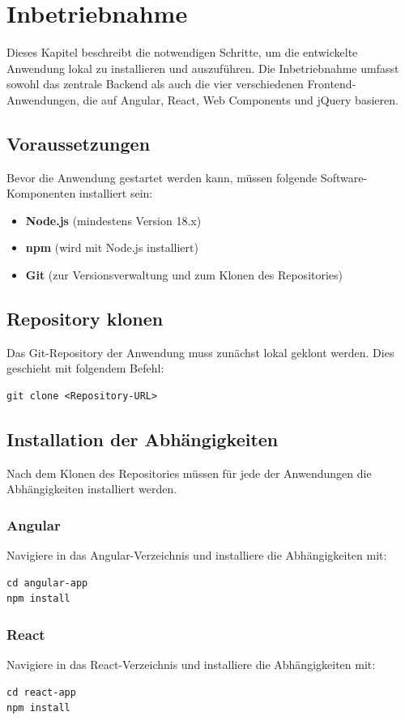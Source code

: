 \documentclass[oneside]{ausarbeitung}
\begin{document}
\chapter{Inbetriebnahme}
Dieses Kapitel beschreibt die notwendigen Schritte, um die entwickelte Anwendung lokal zu installieren und auszuführen. Die Inbetriebnahme umfasst sowohl das zentrale Backend als auch die vier verschiedenen Frontend-Anwendungen, die auf Angular, React, Web Components und jQuery basieren.

\section{Voraussetzungen}
Bevor die Anwendung gestartet werden kann, müssen folgende Software-Komponenten installiert sein:
\begin{itemize}
    \item \textbf{Node.js} (mindestens Version 18.x)
    \item \textbf{npm} (wird mit Node.js installiert)
    \item \textbf{Git} (zur Versionsverwaltung und zum Klonen des Repositories)
\end{itemize}

\section{Repository klonen}
Das Git-Repository der Anwendung muss zunächst lokal geklont werden. Dies geschieht mit folgendem Befehl:
\begin{verbatim}
git clone <Repository-URL>
\end{verbatim}

\section{Installation der Abhängigkeiten}
Nach dem Klonen des Repositories müssen für jede der Anwendungen die Abhängigkeiten installiert werden. 

\subsection{Angular}
Navigiere in das Angular-Verzeichnis und installiere die Abhängigkeiten mit:
\begin{verbatim}
cd angular-app
npm install
\end{verbatim}

\subsection{React}
Navigiere in das React-Verzeichnis und installiere die Abhängigkeiten mit:
\begin{verbatim}
cd react-app
npm install
\end{verbatim}
\end{document}
